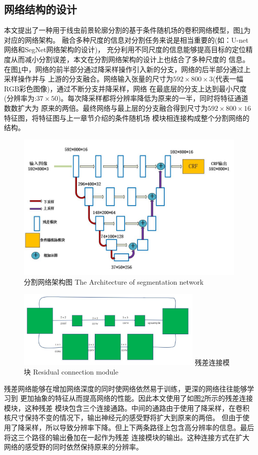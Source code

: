 \subsection{网络结构的设计}
	本文提出了一种用于线虫前景轮廓分割的基于条件随机场的卷积网络模型，图\ref{fig:chap5:arch}为对应的网络架构。
	融合多种尺度的信息对分割任务来说是相当重要的(如：U-net网络\cite{ronneberger2015u}和SegNet网络\cite{badrinarayanan2015segnet}架构的设计)，
	充分利用不同尺度的信息能够提高目标的定位精度从而减小分割误差，本文在分割网络架构的设计上也结合了多种尺度的
	信息。在图\ref{fig:chap5:arch}中，网络的前半部分通过降采样操作引入新的分支，网络的后半部分通过上采样操作并与
	上游的分支融合。网络输入张量的尺寸为$592\times800\times3$(代表一幅RGB彩色图像)，通过不断分支并降采样，网络
	在最底层的分支上达到最小尺度(分辨率为:$37\times50$)。每次降采样都将分辨率降低为原来的一半，同时将特征通道数数扩大为
	原来的两倍。最终网络与最上层的分支融合得到尺寸为$592\times800\times16$特征图，将特征图与上一章节介绍的条件随机场
	模块相连接构成整个分割网络的结构。
	\begin{figure}[thb]
	  \centering
	  \includegraphics[width=13cm]{figure/chap5/arch.jpg}
	  \bicaption
		{分割网络架构图}
		{The Architecture of segmentation network}
	  \label{fig:chap5:arch}
	\end{figure}
	\begin{figure}[htb]
	  \centering
	  \includegraphics[width=9cm]{figure/chap4/residualpooling.jpg}
	  \bicaption
		{残差连接模块}
		{Residual connection module}
	  \label{fig:chap4:respool}
	\end{figure}
	残差网络\cite{he2016deep}能够在增加网络深度的同时使网络依然易于训练，更深的网络往往能够学习到
	更加抽象的特征从而提高网络的性能。因此本文使用了如图\ref{fig:chap4:respool}所示的残差连接模块\cite{chu2017multi}，这种残差
	模块包含三个连接通路。中间的通路由于使用了降采样，在卷积核尺寸保持不变的情况下，输出神经元的感受野将扩大到原来的两倍。
	但由于使用了降采样，所以导致分辨率下降。但上下两条路径上包含高分辨率的信息。最后将这三个路径的输出叠加在一起作为残差
	连接模块的输出。这种连接方式在扩大网络的感受野的同时依然保持原来的分辨率。
	
